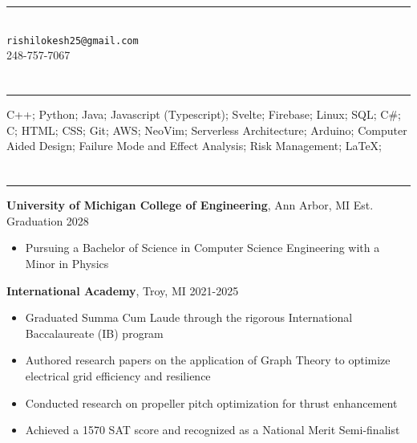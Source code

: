 \documentclass{article}[11pt]
\newcommand{\underlinedsection}[1]{ \section*{\sc{#1}}
	\rule{\textwidth}{1pt} }
\newenvironment{denseitemize} %
{ \begin{itemize}[leftmargin = 20pt, topsep = 0pt, itemsep = 0pt] }
{\end{itemize} }
\newcommand{\education}[3]{ {\textbf{#1}, {#2} \hfill {#3}} }
\begin{document}
\normalsize
\singlespacing

\section*{\centering {}} 
\begin{center}
\rule{3in}{1pt} \\
\texttt{rishilokesh25@gmail.com} \\
248-757-7067 
\end{center} 

\underlinedsection{Skills}
 C++; Python; Java; Javascript (Typescript); Svelte; Firebase; Linux; SQL; C#; C; HTML; CSS; Git; AWS; NeoVim; Serverless Architecture; Arduino; Computer Aided Design; Failure Mode and Effect Analysis; Risk Management; LaTeX;
 
\underlinedsection{Education}
\education{University of Michigan College of Engineering}{Ann Arbor, MI}{Est. Graduation 2028}

\begin{denseitemize}
	\item Pursuing a Bachelor of Science in Computer Science Engineering with a Minor in Physics
\end{denseitemize}
\education{International Academy}{Troy, MI}{2021-2025}
\begin{denseitemize}
	\item Graduated Summa Cum Laude through the rigorous International Baccalaureate (IB) program
        \item Authored research papers on the application of Graph Theory to optimize electrical grid efficiency and resilience
        \item Conducted research on propeller pitch optimization for thrust enhancement
        \item Achieved a 1570 SAT score and recognized as a National Merit Semi-finalist
\end{denseitemize}
\end{document}
